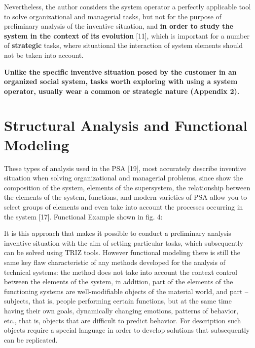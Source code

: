 
Nevertheless, the author considers the system operator a perfectly applicable
tool to solve organizational and managerial tasks, but not for the purpose of
preliminary analysis of the inventive situation, and \textbf{in order to study
  the system in the context of its evolution} [11], which is important for a
number of \textbf{strategic} tasks, where situational the interaction of
system elements should not be taken into account.

\textbf{Unlike the specific inventive situation posed by the customer in an
  organized social system, tasks worth exploring with using a system operator,
  usually wear a common or strategic nature (Appendix 2).}

\section{Structural Analysis and Functional Modeling}

These types of analysis used in the PSA [19], most accurately describe
inventive situation when solving organizational and managerial problems, since
show the composition of the system, elements of the supersystem, the
relationship between the elements of the system, functions, and modern
varieties of PSA allow you to select groups of elements and even take into
account the processes occurring in the system [17]. Functional Example shown
in fig. 4:


It is this approach that makes it possible to conduct a preliminary analysis
inventive situation with the aim of setting particular tasks, which
subsequently can be solved using TRIZ tools. However functional modeling there
is still the same key flaw characteristic of any methods developed for the
analysis of technical systems: the method does not take into account the
context control between the elements of the system, in addition, part of the
elements of the functioning systems are well-modifiable objects of the
material world, and part -- subjects, that is, people performing certain
functions, but at the same time having their own goals, dynamically changing
emotions, patterns of behavior, etc., that is, objects that are difficult to
predict behavior. For description such objects require a special language in
order to develop solutions that subsequently can be replicated.

